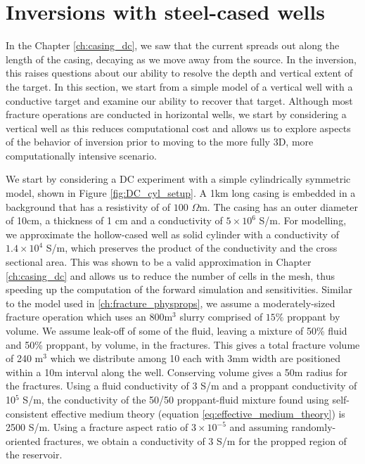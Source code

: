 \section{Inversions with steel-cased wells}

In the Chapter \ref{ch:casing_dc}, we saw that the current spreads out along the length of the casing, decaying as we move away from the source. In the inversion, this raises questions about our ability to resolve the depth and vertical extent of the target. In this section, we start from a simple model of a vertical well with a conductive target and examine our ability to recover that target. Although most fracture operations are conducted in horizontal wells, we start by considering a vertical well as this reduces computational cost and allows us to explore aspects of the behavior of inversion prior to moving to the more fully 3D, more computationally intensive scenario.

We start by considering a DC experiment with a simple cylindrically symmetric model, shown in Figure \ref{fig:DC_cyl_setup}. A 1km long casing is embedded in a background that has a resistivity of of $100$ $\Omega$m. The casing has an outer diameter of 10cm, a thickness of 1 cm and a conductivity of $5 \times 10^6$ S/m. For modelling, we approximate the hollow-cased well as solid cylinder with a conductivity of $1.4 \times 10^4$ S/m, which preserves the product of the conductivity and the cross sectional area. This was shown to be a valid approximation in Chapter \ref{ch:casing_dc} and allows us to reduce the number of cells in the mesh, thus speeding up the computation of the forward simulation and sensitivities. Similar to the model used in \ref{ch:fracture_physprops}, we assume a moderately-sized fracture operation which uses an 800m$^3$ slurry comprised of $15\%$ proppant by volume. We assume leak-off of some of the fluid, leaving a mixture of 50\% fluid and 50\% proppant, by volume, in the fractures. This gives a total fracture volume of 240 m$^3$ which we distribute among 10 each with 3mm width are positioned within a 10m interval along the well. Conserving volume gives a 50m radius for the fractures. Using a fluid conductivity of 3 S/m and a proppant conductivity of 10$^5$ S/m, the conductivity of the 50/50 proppant-fluid mixture found using self-consistent effective medium theory (equation \ref{eq:effective_medium_theory}) is 2500 S/m. Using a fracture aspect ratio of $3 \times 10^{-5}$ and assuming randomly-oriented fractures, we obtain a conductivity of 3 S/m for the propped region of the reservoir.


